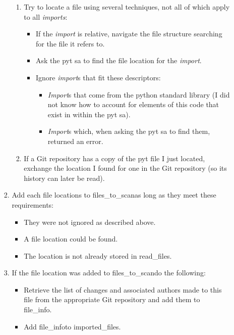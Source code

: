 \documentclass[a4paper,man,natbib,floatsintext]{apa6}
\begin{document}
\begin{enumerate}
\begin{enumerate}
\begin{enumerate}
\begin{enumerate}
          \item Try to locate a file using several techniques, not all of which apply to all \textit{imports}:
          \begin{itemize}
            \item If the \textit{import} is relative, navigate the file structure searching for the file it refers to.
            \item Ask the \Gls{pyt} \gls{sa} to find the file location for the \textit{import}.
            \item Ignore \textit{import}s that fit these descriptors:
            \begin{itemize}
              \item \textit{Import}s that come from the python standard library (I did not know how to account for elements of this code that exist in within the \Gls{pyt} \gls{sa}).
              \item \textit{Import}s which, when asking the \Gls{pyt} \gls{sa} to find them, returned an error.
            \end{itemize}
          \end{itemize}
          \item If a Git repository has a copy of the \Gls{pyt} file I just located, exchange the location I found for one in the Git repository (so its history can later be read).
        \end{enumerate}
        \item Add each file locations to \textlangle files\_to\_scan\textrangle as long as they meet these requirements:
        \begin{itemize}
          \item They were not ignored as described above.
          \item A file location could be found.
          \item The location is not already stored in \textlangle read\_files\textrangle.
        \end{itemize}
        \item If the file location was added to \textlangle files\_to\_scan\textrangle do the following:
        \begin{itemize}
          \item Retrieve the list of changes and associated authors made to this file from the appropriate Git repository and add them to \textlangle file\_info\textrangle.
          \item Add \textlangle file\_info\textrangle to \textlangle imported\_files\textrangle.

\end{itemize}
\end{enumerate}
\end{enumerate}
\end{enumerate}
\end{document}
